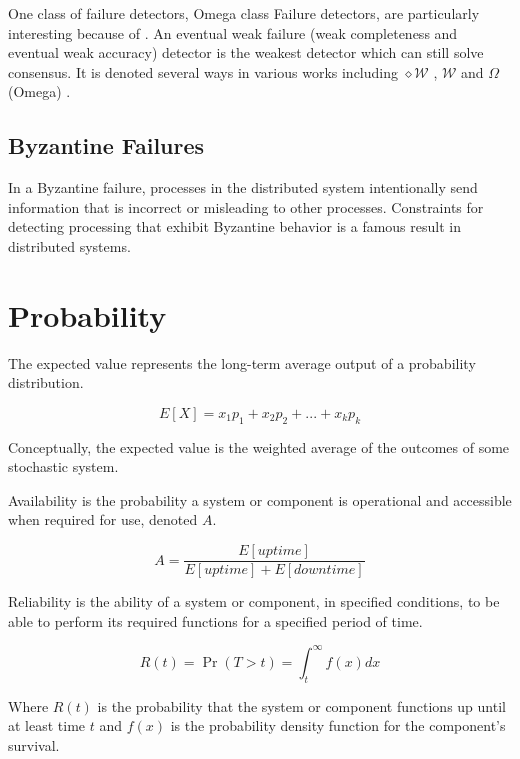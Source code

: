 One class of failure detectors, Omega class Failure detectors, are particularly interesting because of \cite{LEADERELECTIONEVAL}. An eventual weak failure (weak completeness and eventual weak accuracy) detector is the weakest detector which can still solve consensus. It is denoted several ways in various works including $\diamond \mathcal{W}$ \cite{FAILUREDETECTORS}, $\mathcal{W}$ \cite{WEAKESTFAILURE1} \cite{WEAKESTFAILURE2} and $\Omega$ (Omega) \cite{LEADERELECTIONEVAL}.


\subsection{Byzantine Failures}

In a Byzantine failure, processes in the distributed system intentionally send information that is incorrect or misleading to other processes.
Constraints for detecting processing that exhibit Byzantine behavior is a famous result in distributed systems.\cite{byzantine-generals}

\section{Probability}

The expected value represents the long-term average output of a probability distribution.

\begin{equation}E[X] = x_1 p_1 + x_2 p_2 + ... + x_k p_k \end{equation}

Conceptually, the expected value is the weighted average of the outcomes of some stochastic system.

Availability is the probability a system or component is operational and accessible when required for use, denoted $A$.

\begin{equation}A = \frac{E[uptime]}{E[uptime]+E[downtime]}\end{equation}

Reliability is the ability of a system or component, in specified conditions, to be able to perform its required functions for a specified period of time.

\begin{equation}R(t) = \Pr(T > t) = \int_t^{\infty} f(x) dx\end{equation}

Where $R(t)$ is the probability that the system or component functions up until at least time $t$ and $f(x)$ is the probability density function for the component's survival.

